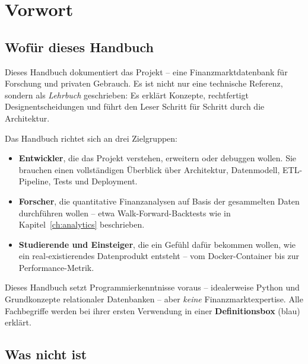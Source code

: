 
\chapter{Vorwort}

\section{Wofür dieses Handbuch}

Dieses Handbuch dokumentiert das Projekt  -- eine
Finanzmarktdatenbank für Forschung und privaten Gebrauch. Es ist nicht
nur eine technische Referenz, sondern als \emph{Lehrbuch} geschrieben:
Es erklärt Konzepte, rechtfertigt Designentscheidungen und führt den
Leser Schritt für Schritt durch die Architektur.

Das Handbuch richtet sich an drei Zielgruppen:

\begin{itemize}
  \item \textbf{Entwickler}, die das Projekt verstehen, erweitern oder
        debuggen wollen. Sie brauchen einen vollständigen Überblick über
        Architektur, Datenmodell, ETL-Pipeline, Tests und Deployment.
  \item \textbf{Forscher}, die quantitative Finanzanalysen auf Basis
        der gesammelten Daten durchführen wollen -- etwa Walk-Forward-Backtests
        wie in Kapitel~\ref{ch:analytics} beschrieben.
  \item \textbf{Studierende und Einsteiger}, die ein Gefühl dafür
        bekommen wollen, wie ein real-existierendes Datenprodukt
        entsteht -- vom Docker-Container bis zur Performance-Metrik.
\end{itemize}

\begin{merke}
Dieses Handbuch setzt Programmierkenntnisse voraus -- idealerweise
Python und Grundkonzepte relationaler Datenbanken -- aber \emph{keine}
Finanzmarktexpertise. Alle Fachbegriffe werden bei ihrer ersten
Verwendung in einer \textbf{Definitionsbox} (blau) erklärt.
\end{merke}

\section{Was  nicht ist}

